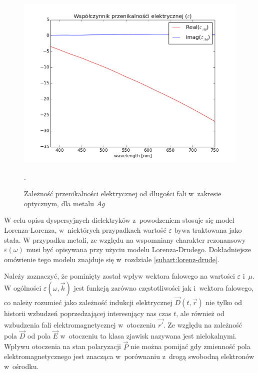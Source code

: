\begin{figure}[tb]
	\includegraphics[width=\textwidth]{images/agtio2eps.png}
	\label{fig:agtio2eps}
	\caption{Zależność przenikalności elektrycznej od długości fali w~zakresie optycznym, dla metalu $Ag$\cite{PhysRevB.6.4370} }.  
\end{figure}
W celu opisu dyspersyjnych dielektryków z~powodzeniem stosuje się model Lorenza-Lorenza, w~niektórych przypadkach wartość $\varepsilon$ bywa traktowana jako stała. W przypadku metali, ze względu na wspomniany charakter rezonansowy $\varepsilon(\omega)$  musi być opisywana przy użyciu modelu Lorenza-Drudego. Dokładniejsze omówienie tego modelu znajduje się w~rozdziale \ref{subart:lorenz-drude}.

Należy zaznaczyć, że pominięty został wpływ wektora falowego na wartości $\varepsilon$ i~$\mu$. W ogólności $\varepsilon(\omega,\vec{k})$ jest funkcją zarówno częstotliwości jak i~wektora falowego, co należy rozumieć jako zależność indukcji elektrycznej $\vec{D}(t,\vec{r})$ nie tylko od historii wzbudzeń poprzedzającej interesujący nas czas $t$, ale również od wzbudzenia fali elektromagnetycznej w~otoczeniu $\vec{r'}$. Ze względu na zależność pola $\vec{D}$ od pola $\vec{E}$ w~otoczeniu ta klasa zjawisk nazywana jest nielokalnymi. Wpływu otoczenia na stan polaryzacji $\vec{P}$ nie można pomijać gdy zmienność pola elektromagnetycznego jest znacząca w~porównaniu z~drogą swobodną elektronów w~ośrodku.



